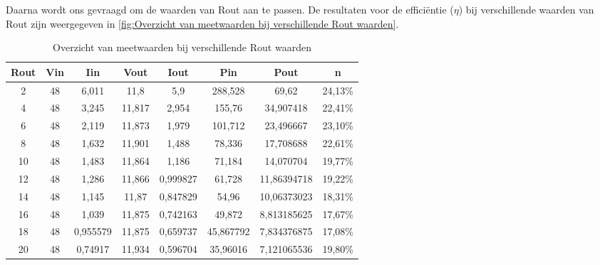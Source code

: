 Daarna wordt ons gevraagd om de waarden van Rout aan te passen. De resultaten voor de efficiëntie ($\eta$) bij verschillende waarden van Rout zijn weergegeven in \autoref{fig:Overzicht van meetwaarden bij verschillende Rout waarden}.
\begin{table}[h!]
\centering
\begin{tabular}{|c|c|c|c|c|c|c|c|}
\hline
\textbf{Rout} & \textbf{Vin} & \textbf{Iin} & \textbf{Vout} & \textbf{Iout} & \textbf{Pin} & \textbf{Pout} & \textbf{n} \\
\hline
2  & 48 & 6,011   & 11,8  & 5,9     & 288,528  & 69,62     & 24,13\% \\
4  & 48 & 3,245   & 11,817 & 2,954   & 155,76   & 34,907418 & 22,41\% \\
6  & 48 & 2,119   & 11,873 & 1,979   & 101,712  & 23,496667 & 23,10\% \\
8  & 48 & 1,632   & 11,901 & 1,488   & 78,336   & 17,708688 & 22,61\% \\
10 & 48 & 1,483   & 11,864 & 1,186   & 71,184   & 14,070704 & 19,77\% \\
12 & 48 & 1,286   & 11,866 & 0,999827 & 61,728   & 11,86394718 & 19,22\% \\
14 & 48 & 1,145   & 11,87  & 0,847829 & 54,96    & 10,06373023 & 18,31\% \\
16 & 48 & 1,039   & 11,875 & 0,742163 & 49,872   & 8,813185625 & 17,67\% \\
18 & 48 & 0,955579 & 11,875 & 0,659737 & 45,867792 & 7,834376875 & 17,08\% \\
20 & 48 & 0,74917  & 11,934 & 0,596704 & 35,96016  & 7,121065536 & 19,80\% \\
\hline
\end{tabular}
\caption{Overzicht van meetwaarden bij verschillende Rout waarden}\label{fig:Overzicht van meetwaarden bij verschillende Rout waarden}
\end{table}
